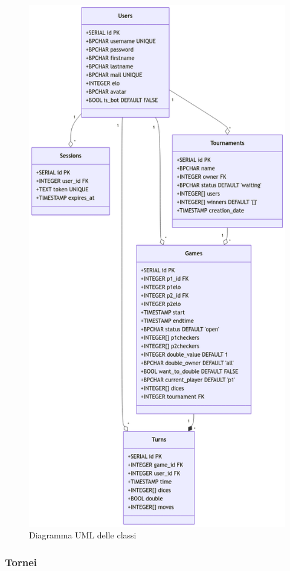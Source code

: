 \documentclass{article}
\begin{document}
\begin{figure}[H]
    \centering
    \includegraphics[width=12cm, width=8cm]{uml-classes}
    \caption{Diagramma UML delle classi}
    \label{fig:class-diagram}
\end{figure}

\subsubsection{Tornei}
\end{document}
